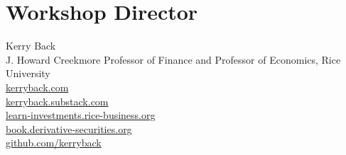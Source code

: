 \documentclass[11pt]{scrartcl}
\begin{document}
\section*{Workshop Director}

Kerry Back \\
J. Howard Creekmore Professor of Finance and Professor of Economics, Rice University \\
\href{https://kerryback.com}{kerryback.com} \\
\href{https://kerryback.substack.com}{kerryback.substack.com} \\
\href{https://learn-investments.rice-business.org}{learn-investments.rice-business.org} \\
\href{https://book.derivative-securities.org}{book.derivative-securities.org} \\
\href{https://github.com/kerryback}{github.com/kerryback}
\end{document}
